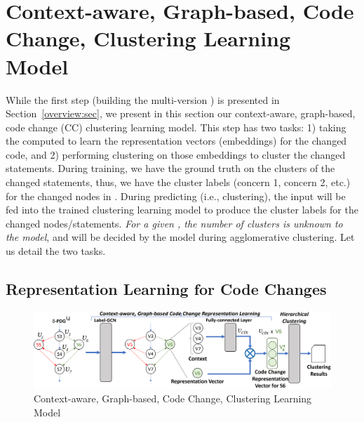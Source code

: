 
\section{Context-aware, Graph-based, Code Change, Clustering Learning Model}
\label{clustering-model:sec}


While the first step (building the multi-version {\mvpdg}) is
presented in Section~\ref{overview:sec}, we present in this section
our context-aware, graph-based, code change (CC) clustering learning
model.  This step has two tasks: 1) taking the computed {\mvpdg} to
learn the representation vectors (embeddings) for the changed code,
and 2) performing clustering on those embeddings to cluster the
changed statements.  During training, we have the ground truth on the
clusters of the changed statements, thus, we have the cluster labels
(concern 1, concern 2, etc.) for the changed nodes in {\mvpdg}. During
predicting (i.e., clustering), the input {\mvpdg} will be fed into the
trained clustering learning model to produce the cluster labels for
the changed nodes/statements. {\em For a given {\mvpdg}, the number of
clusters is unknown to the model}, and will be decided by the model
during agglomerative clustering. Let us detail the two tasks.



\subsection{Representation Learning for Code Changes}
\label{vector:sec}

\begin{figure}[t]
	\centering \includegraphics[width=5.8in]{figures/STEP_2-new-3.png}
	\vspace{-6pt}
	\caption{Context-aware, Graph-based, Code Change, Clustering Learning Model}
	\label{fig:step-2}
\end{figure}

